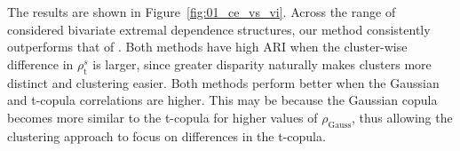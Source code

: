 \documentclass[12pt,compact]{article}
\newcommand{\rhou}[1]{\rho_{\text{#1}}}
\begin{document}
The results are shown in Figure~\ref{fig:01_ce_vs_vi}. 
Across the range of considered bivariate extremal dependence structures, our method consistently outperforms that of \citet{Vignotto2021}. 
Both methods have high ARI when the cluster-wise difference in $\rhou{t}^s$ is larger, since greater disparity naturally makes clusters more distinct and clustering easier. 
Both methods perform better when the Gaussian and t-copula correlations are higher.
This may be because the Gaussian copula becomes more similar to the t-copula for higher values of $\rhou{Gauss}$, thus allowing the clustering approach to focus on differences in the t-copula.
\end{document}

